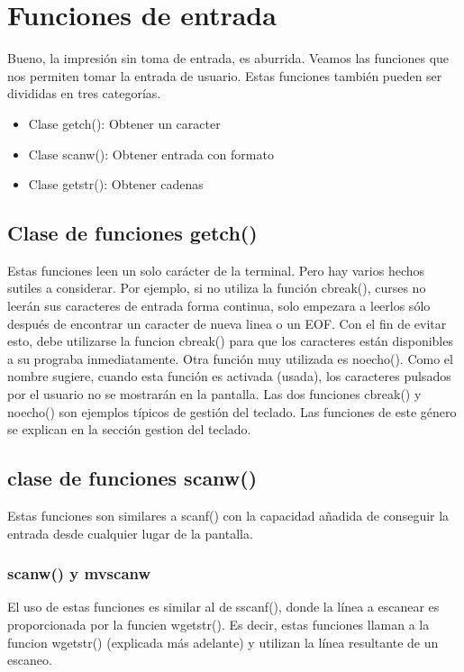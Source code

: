\documentclass{article}
\begin{document}
\section{Funciones de entrada}%
Bueno, la impresión sin toma de entrada, es aburrida. Veamos las funciones que
nos permiten tomar la entrada de usuario. Estas funciones también pueden ser
divididas en tres categorías.

\begin{itemize}
  \item Clase getch(): Obtener un caracter
  \item Clase scanw(): Obtener entrada con formato
  \item Clase getstr(): Obtener cadenas
\end{itemize}

\subsection{Clase de funciones getch()}%
Estas funciones leen un solo carácter de la terminal. Pero hay varios hechos
sutiles a considerar. Por ejemplo, si no utiliza la función cbreak(), curses no
leerán sus caracteres de entrada forma continua, solo empezara a leerlos sólo
después de encontrar un caracter de nueva linea o un EOF. Con el fin de evitar
esto, debe utilizarse la funcion cbreak() para que los caracteres están
disponibles a su prograba inmediatamente. Otra función muy utilizada es
noecho(). Como el nombre sugiere, cuando esta función es activada (usada), los
caracteres pulsados por el usuario no se mostrarán en la pantalla. Las dos
funciones cbreak() y noecho() son ejemplos típicos de gestión del teclado. Las
funciones de este género se explican en la sección gestion del teclado.

\subsection{clase de funciones scanw()}%
Estas funciones son similares a scanf() con la capacidad añadida de conseguir
la entrada desde cualquier lugar de la pantalla.

\subsubsection{scanw() y mvscanw}%
El uso de estas funciones es similar al de sscanf(), donde la línea a escanear
es proporcionada por la funcien wgetstr(). Es decir, estas funciones llaman a
la funcion wgetstr() (explicada más adelante) y utilizan la línea resultante de
un escaneo.
\end{document}
